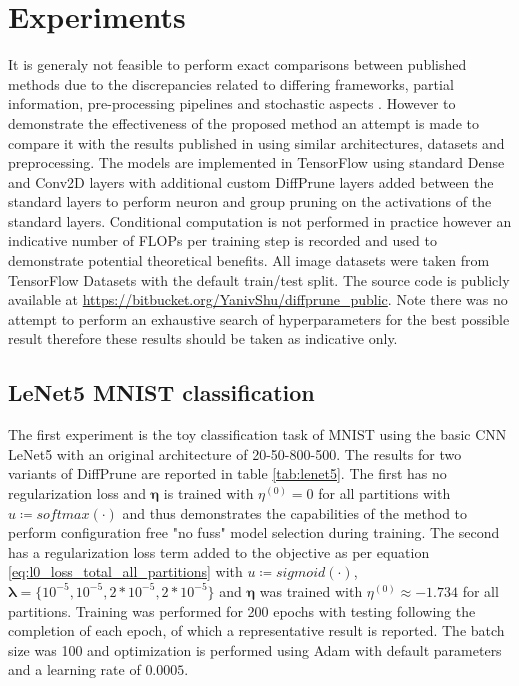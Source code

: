 \documentclass[final,1p,times]{elsarticle}
\begin{document}
\section{Experiments}
It is generaly not feasible to perform exact comparisons between published methods due to the discrepancies related to differing frameworks, partial information, pre-processing pipelines and stochastic aspects \cite{DBLP:conf/mlsys/BlalockOFG20}. However to demonstrate the effectiveness of the proposed method an attempt is made to compare it with the results published in \cite{louizos2018learning, Huang_2020_CVPR_Workshops} using similar architectures, datasets and preprocessing. The models are implemented in TensorFlow \cite{tensorflow2015-whitepaper} using standard Dense and Conv2D layers with additional custom DiffPrune layers added between the standard layers to perform neuron and group pruning on the activations of the standard layers. Conditional computation is not performed in practice however an indicative number of FLOPs per training step is recorded and used to demonstrate potential theoretical benefits. All image datasets were taken from TensorFlow Datasets \cite{TFDS} with the default train/test split. The source code is publicly available at \href{https://bitbucket.org/YanivShu/diffprune_public}{https://bitbucket.org/YanivShu/diffprune\_public}. Note there was no attempt to perform an exhaustive search of hyperparameters for the best possible result therefore these results should be taken as indicative only.

\subsection{LeNet5 MNIST classification}
The first experiment is the toy classification task of MNIST using the basic CNN LeNet5 \cite{Lecun98gradient-basedlearning} with an original architecture of 20-50-800-500. The results for two variants of DiffPrune are reported in table \ref{tab:lenet5}. The first has no regularization loss and $\boldsymbol{\eta}$ is trained with $\eta^{(0)}=0$ for all partitions with $u \coloneqq softmax ( \cdot )$ and thus demonstrates the capabilities of the method to perform configuration free "no fuss" model selection during training. The second has a regularization loss term added to the objective as per equation \eqref{eq:l0_loss_total_all_partitions} with $u \coloneqq sigmoid ( \cdot )$, $\boldsymbol{\lambda} = \{ 10^{-5}, 10^{-5}, 2*10^{-5}, 2*10^{-5} \}$ and $\boldsymbol{\eta}$ was trained with $\eta^{(0)} \approx -1.734$ for all partitions. Training was performed for 200 epochs with testing following the completion of each epoch, of which a representative result is reported. The batch size was 100 and optimization is performed using Adam with default parameters and a learning rate of $0.0005$.
\end{document}
